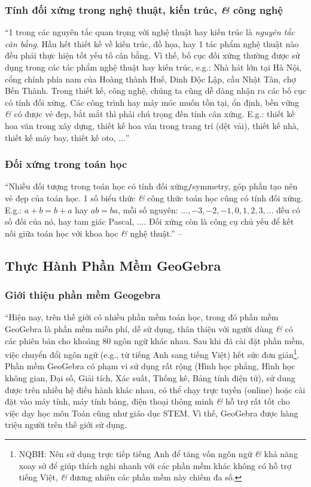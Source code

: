 \documentclass{article}
\numberwithin{equation}{section}
\begin{document}
\subsubsection{Tính đối xứng trong nghệ thuật, kiến trúc, \textit{\&} công nghệ}
``1 trong các nguyên tắc quan trọng với nghệ thuật hay kiến trúc là \textit{nguyên tắc cân bằng}. Hầu hết thiết kế về kiến trúc, đồ họa, hay 1 tác phẩm nghệ thuật nào đều phải thực hiện tốt yếu tố cân bằng. Vì thế, bố cục đối xứng thường được sử dụng trong các tác phẩm nghệ thuật hay kiến trúc, e.g.: Nhà hát lớn tại Hà Nội, cổng chính phía nam của Hoàng thành Huế, Dinh Độc Lập, cầu Nhật Tân, chợ Bến Thành. Trong thiết kế, công nghệ, chúng ta cũng dễ dàng nhận ra các bố cục có tính đối xứng. Các công trình hay máy móc muốn tồn tại, ổn định, bền vững \textit{\&} có được vẻ đẹp, bắt mắt thì phải chú trọng đến tính cân xứng. E.g.: thiết kế hoa văn trong xây dựng, thiết kế hoa văn trong trang trí (dệt vải), thiết kế nhà, thiết kế máy bay, thiết kế oto, $\ldots$'' \cite[pp. 114--115]{Thai_Anh_Dat_Ha_Loan_Nam_Quang_Toan_6_tap_1}

\subsubsection{Đối xứng trong toán học}
``Nhiều đối tượng trong toán học có tính đối xứng\texttt{/}symmetry, góp phần tạo nên vẻ đẹp của toán học. 1 số biểu thức \textit{\&} công thức toán học cũng có tính đối xứng. E.g.: $a + b = b + a$ hay $ab = ba$, mỗi số nguyên: $\ldots,-3,-2,-1,0,1,2,3,\ldots$ đều có số đối của nó, hay tam giác Pascal, $\ldots$. Đối xứng còn là công cụ chủ yếu để kết nối giữa toán học với khoa học \textit{\&} nghệ thuật.'' -- \cite[p. 115]{Thai_Anh_Dat_Ha_Loan_Nam_Quang_Toan_6_tap_1}

\subsection{Thực Hành Phần Mềm GeoGebra}

\subsubsection{Giới thiệu phần mềm Geogebra}
``Hiện nay, trên thế giới có nhiều phần mềm toán học, trong đó phần mềm GeoGebra là phần mềm miễn phí, dễ sử dụng, thân thiện với người dùng \textit{\&} có các phiên bản cho khoảng 80 ngôn ngữ khác nhau. Sau khi đã cài đặt phần mềm, việc chuyển đổi ngôn ngữ (e.g., từ tiếng Anh sang tiếng Việt) hết sức đơn giản\footnote{NQBH: Nên sử dụng trực tiếp tiếng Anh để tăng vốn ngôn ngữ \textit{\&} khả năng xoay sở để giúp thích nghi nhanh với các phần mềm khác không có hỗ trợ tiếng Việt, \textit{\&} đương nhiên các phần mềm này chiếm đa số.}. Phần mềm GeoGebra có phạm vi sử dụng rất rộng (Hình học phẳng, Hình học không gian, Đại số, Giải tích, Xác suất, Thống kê, Bảng tính điện tử), sử dung được trên nhiều hệ điều hành khác nhau, có thể chạy trực tuyến (online) hoặc cài đặt vào máy tính, máy tính bảng, điện thoại thông minh \textit{\&} hỗ trợ rất tốt cho việc dạy học môn Toán cũng như giáo dục STEM. Vì thế, GeoGebra được hàng triệu người trên thế giới sử dụng.
\end{document}
